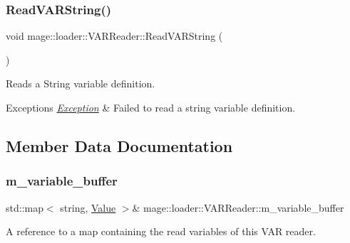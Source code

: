 \subsubsection{\texorpdfstring{Read\+V\+A\+R\+String()}{ReadVARString()}}
{\footnotesize\ttfamily void mage\+::loader\+::\+V\+A\+R\+Reader\+::\+Read\+V\+A\+R\+String (\begin{DoxyParamCaption}{ }\end{DoxyParamCaption})\hspace{0.3cm}{\ttfamily [private]}}

Reads a String variable definition.


\begin{DoxyExceptions}{Exceptions}
{\em \mbox{\hyperlink{classmage_1_1_exception}{Exception}}} & Failed to read a string variable definition. \\
\hline
\end{DoxyExceptions}


\subsection{Member Data Documentation}
\mbox{\label{classmage_1_1loader_1_1_v_a_r_reader_a71291d47ea9f9d679bfd7584447ae6bb}} 
\subsubsection{\texorpdfstring{m\+\_\+variable\+\_\+buffer}{m\_variable\_buffer}}
{\footnotesize\ttfamily std\+::map$<$ string, \mbox{\hyperlink{namespacemage_aa1fe0628487e0706e44efdc62dbdb3a2}{Value}} $>$\& mage\+::loader\+::\+V\+A\+R\+Reader\+::m\+\_\+variable\+\_\+buffer\hspace{0.3cm}{\ttfamily [private]}}

A reference to a map containing the read variables of this V\+AR reader. 